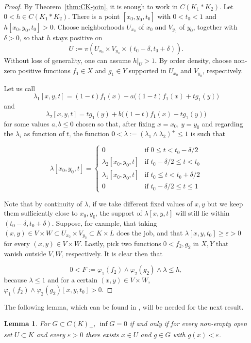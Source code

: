 \documentclass[12pt]{amsart}
\theoremstyle{plain}
\newtheorem{lemma}[theorem]{Lemma}
\theoremstyle{definition}
\begin{document}
\begin{proof}
By Theorem~\ref{thm:CK-join}, it is enough to work in $C(K_1\ast K_2)$. Let $0<h\in C(K_1\ast K_2)$. There is a point $[x_0,y_0,t_0]$ with $0<t_0<1$ and $h[x_0,y_0,t_0]>0$. Choose neighborhoods $U_{x_0}$ of $x_0$ and $V_{y_0}$ of $y_0$, together with $\delta>0$, so that $h$ stays positive on
\[
U:=\pi(U_{x_0}\times V_{y_0}\times (t_0-\delta,t_0+\delta)).
\]
Without loss of generality, one can assume $h|_U>1$.
By order density, choose non-zero positive functions $f_1\in X$ and $g_1\in Y$ supported in $U_{x_0}$ and $V_{y_0}$, respectively.

Let us call \[
\lambda_1[x,y,t]=(1-t)f_1(x)+a\Big((1-t)f_1(x)+tg_1(y)\Big ) \]and \[\lambda_2[x,y,t]=tg_1(y)+b\Big ((1-t)f_1(x)+tg_1(y)\Big ) \] for some values $a,b\leq0$ chosen so that, after fixing $x=x_0$, $y=y_0$ and regarding the $\lambda_i$ as function of $t$, the function $0<\lambda:=(\lambda_1\wedge \lambda_2)^+\leq 1$ is such that

\[
\lambda[x_0,y_0,t]=
\begin{cases}
0 & \text{if } 0\leq t<t_0-\delta/2 \\
\lambda_2[x_0,y_0,t] & \text{if } t_0-\delta/2\leq t<t_0 \\ 


\lambda_1[x_0,y_0,t] & \text{if } t_0\leq t <t_0+\delta/2 \\
0 & \text{if } t_0-\delta/2\leq t\leq 1
\end{cases}
\]

Note that by continuity of $\lambda$, if we take different fixed values of $x,y$ but we keep them sufficiently close to $x_0,y_0$, the support of $\lambda[x,y,t]$ will still lie within $(t_0-\delta,t_0+\delta)$. Suppose, for example, that taking $(x,y)\in V\times W\subset U_{x_0}\times V_{y_0}\subset K\times L$ does the job, and that $\lambda[x,y,t_0]\geq\varepsilon>0$ for every $(x,y)\in V\times W$. Lastly, pick two functions $0<f_2,g_2$ in $X,Y$ that vanish outside $V,W$, respectively. It is clear then that

$$0<F:=\varphi_1(f_2)\wedge \varphi_2(g_2)\wedge\lambda\leq h,$$
because $\lambda\leq 1$ and for a certain $(x,y)\in V\times W$, $\varphi_1(f_2)\wedge \varphi_2(g_2)[x,y,t_0]>0$.
\end{proof}

The following lemma, which can be found in \cite[Lemma 3.1]{o-conv-ck}, will be needed for the next result.

\begin{lemma}\label{lem:order-ck}
For $G\subset C(K)_+$, $\inf G=0$ if and only if for every non-empty open set $U\subset K$ and every $\varepsilon>0$ there exists $x\in U$ and $g\in G$ with $g(x)<\varepsilon$.
\end{lemma} 
\end{document}
